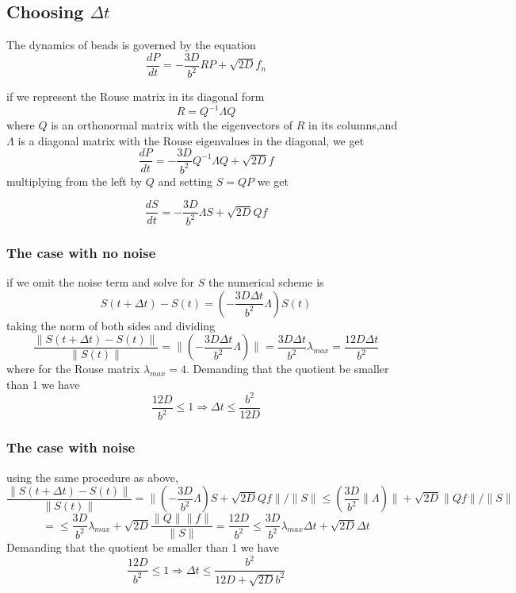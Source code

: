 \documentclass{paper}
\begin{document}
\subsection{Choosing $\Delta t$}
The dynamics of beads is governed by the equation
\begin{equation*}
\frac{dP}{dt} = -\frac{3D}{b^2}RP+\sqrt{2D}f_n
\end{equation*}

if we represent the Rouse matrix in its diagonal form 
\begin{equation*}
R=Q^{-1}\Lambda Q
\end{equation*}
where $Q$ is an orthonormal matrix with the eigenvectors of $R$ in its columns,and $\Lambda$ is a diagonal matrix with the Rouse eigenvalues in the diagonal, we get 
\begin{equation*}
\frac{dP}{dt} = -\frac{3D}{b^2}Q^{-1}\Lambda Q+\sqrt{2D}f
\end{equation*}
multiplying from the left by $Q$ and setting $S=QP$ we get 

\begin{equation*}
\frac{dS}{dt}=-\frac{3D}{b^2}\Lambda S+\sqrt{2D}Qf
\end{equation*}
\subsubsection{The case with no noise}
if we omit the noise term and solve for $S$ 
the numerical scheme is 
\begin{equation*}
S(t+\Delta t)-S(t)=(-\frac{3D\Delta t}{b^2}\Lambda)S(t)
\end{equation*}
taking the norm of both sides and dividing 
\begin{equation*}
\frac{\|S(t+\Delta t)-S(t)\|}{\|S(t)\|}=\|(-\frac{3D\Delta t}{b^2}\Lambda)\| = \frac{3D\Delta t}{b^2}\lambda_{max}= \frac{12D\Delta t}{b^2}
\end{equation*}
where for the Rouse matrix $\lambda_{max} = 4$.  Demanding that the quotient be smaller than 1 we have 
\begin{equation*}
 \frac{12D}{b^2}\leq1 \Longrightarrow \Delta t \leq \frac{b^2}{12D}
 \end{equation*}
 \subsubsection{The case with noise}
 using the same procedure as above, 
 \begin{equation*}
\frac{\|S(t+\Delta t)-S(t)\|}{\|S(t)\|}=\|(-\frac{3D}{b^2}\Lambda)S+\sqrt{2D}Qf\|/\|S\|\leq(\frac{3D}{b^2}\|\Lambda)\| +\sqrt{2D}\|Qf\|/\|S\|
 \end{equation*}
 \begin{equation*}
 =\leq \frac{3D}{b^2}\lambda_{max} +\sqrt{2D}\frac{\|Q\|\|f\|}{\|S\|}=\frac{12D}{b^2}\leq\frac{3D}{b^2}\lambda_{max}\Delta t +\sqrt{2D}\Delta t
 \end{equation*}
Demanding that the quotient be smaller than 1 we have 
\begin{equation*}
 \frac{12D}{b^2}\leq1 \Longrightarrow \Delta t \leq \frac{b^2}{12D+\sqrt{2D}b^2}
 \end{equation*}
\end{document}
